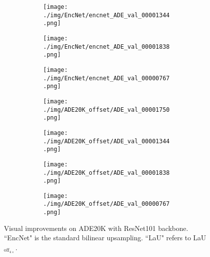 \documentclass[10pt,twocolumn,letterpaper]{article}
\begin{document}
\begin{figure}
\begin{subfigure}[t]{0.11\textwidth}
        \begin{subfigure}[t]{\textwidth}
                \texttt{[image: ./img/EncNet/encnet\_ADE\_val\_00001344.png]}
            \end{subfigure}\vspace{.1ex}

        \begin{subfigure}[t]{\textwidth}
                \texttt{[image: ./img/EncNet/encnet\_ADE\_val\_00001838.png]}
            \end{subfigure}\vspace{.1ex}

            \begin{subfigure}[t]{\textwidth}
                \texttt{[image: ./img/EncNet/encnet\_ADE\_val\_00000767.png]}
            \captionsetup{justification=centering}
        \label{d}
            \end{subfigure}
    \end{subfigure}
\begin{subfigure}[t]{0.11\textwidth}
        \begin{subfigure}[t]{\textwidth}
                \texttt{[image: ./img/ADE20K\_offset/ADE\_val\_00001750.png]}
            \end{subfigure}\vspace{.1ex}

        \begin{subfigure}[t]{\textwidth}
                \texttt{[image: ./img/ADE20K\_offset/ADE\_val\_00001344.png]}
            \end{subfigure}\vspace{.1ex}

        \begin{subfigure}[t]{\textwidth}
                \texttt{[image: ./img/ADE20K\_offset/ADE\_val\_00001838.png]}
            \end{subfigure}\vspace{.1ex}

            \begin{subfigure}[t]{\textwidth}
                \texttt{[image: ./img/ADE20K\_offset/ADE\_val\_00000767.png]}
        \label{e}
            \end{subfigure}
    \end{subfigure}
        \caption{Visual improvements on ADE20K with ResNet101 backbone. ``EncNet" is the standard bilinear upsampling. ``LaU" refers to LaU$_{\text{off}_{4\times}}$.}
\label{cmp}
\end{figure}
\end{document}
